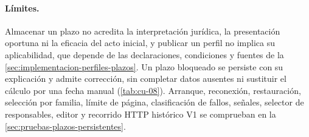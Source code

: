 \paragraph{Límites.} Almacenar un plazo no acredita la interpretación jurídica, la presentación oportuna ni la eficacia del acto inicial, y publicar un perfil no implica su aplicabilidad, que depende de las declaraciones, condiciones y fuentes de la \cref{sec:implementacion-perfiles-plazos}. Un plazo bloqueado se persiste con su explicación y admite corrección, sin completar datos ausentes ni sustituir el cálculo por una fecha manual (\cref{tab:cu-08}). Arranque, reconexión, restauración, selección por familia, límite de página, clasificación de fallos, señales, selector de responsables, editor y recorrido HTTP histórico V1 se comprueban en la \cref{sec:pruebas-plazos-persistentes}.

